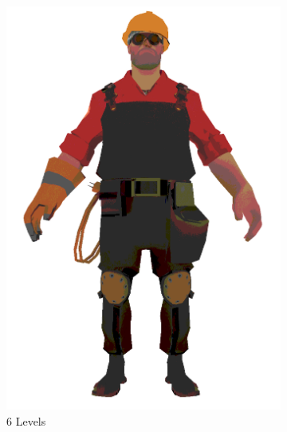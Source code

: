 \begin{figure}[h]
\begin{subfigure}[b]{0.2\textwidth}
        \includegraphics[width=\textwidth]{img/textures/CelShadeTexture6.png}
        \caption{6 Levels}
        \label{fig:CelShadeTexture4}
    \end{subfigure}
    ~
    \begin{subfigure}[b]{0.2\textwidth}

\end{subfigure}
\end{figure}
